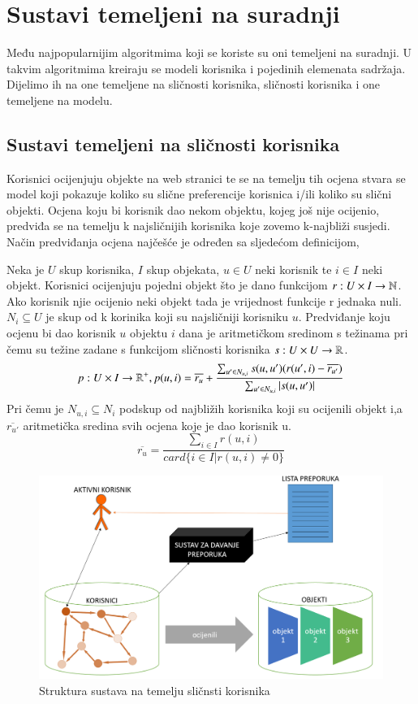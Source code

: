 \documentclass[a4paper,oneside,12pt]{memoir} %
\begin{document}
\chapter{Sustavi temeljeni na suradnji}
\par Među najpopularnijim algoritmima koji se koriste su oni temeljeni na suradnji. U takvim algoritmima kreiraju se modeli korisnika i pojedinih elemenata sadržaja. Dijelimo ih na one temeljene na sličnosti korisnika, sličnosti korisnika i one temeljene na modelu.
%
\section{Sustavi temeljeni na sličnosti korisnika}
%
Korisnici ocijenjuju objekte na web stranici te se na temelju tih ocjena stvara se model koji pokazuje koliko su slične preferencije korisnica i/ili koliko su slični objekti. Ocjena koju bi korisnik dao nekom objektu, kojeg još nije ocijenio, predviđa se na temelju k najsličnijih korisnika koje zovemo k-najbliži susjedi. Način predviđanja ocjena najčešće je određen sa sljedećom definicijom,
\begin{defn}
Neka je $U$ skup korisnika, $I$ skup objekata, $u\in U$ neki korisnik te $i\in I$ neki objekt. Korisnici ocijenjuju pojedni objekt što je dano funkcijom $r:U\times I \rightarrow \mathbb{N}$. Ako korisnik njie ocijenio neki objekt tada je vrijednost funkcije r jednaka nuli. $N_i \subseteq U$ je skup od k korinika koji su najsličniji korisniku $u$. Predviđanje koju ocjenu bi dao korisnik $u$ objektu $i$ dana je aritmetičkom sredinom s težinama pri čemu su težine zadane s funkcijom sličnosti korisnika $s:U\times U\rightarrow \mathbb{R}$. 
\[ p:U\times I \rightarrow \mathbb{R}^+, p(u,i) = \overline{r_{u}}+\frac{\sum_{u'\in N_{u,i}}s(u,u')(r(u',i)-\overline{r_{u'}})}{\sum_{u'\in N_{u,i}}|s(u,u')|} \]
Pri čemu je $N_{u,i} \subseteq N_i$ podskup od najbližih korisnika koji su ocijenili objekt i,a $\overline{r_{u'}}$ aritmetička sredina svih ocjena koje je dao korisnik u.
\[ \overline{r_{u}}=\frac{\sum_{i\in I}r(u,i)}{card\{i\in I | r(u,i) \neq 0 \} } \]
\end{defn}
\begin{figure}
\begin{center}
\includegraphics[scale=0.4]{slike/user-based.png}
\caption{Struktura sustava na temelju sličnsti korisnika}
\end{center}
\end{figure}
\end{document}
